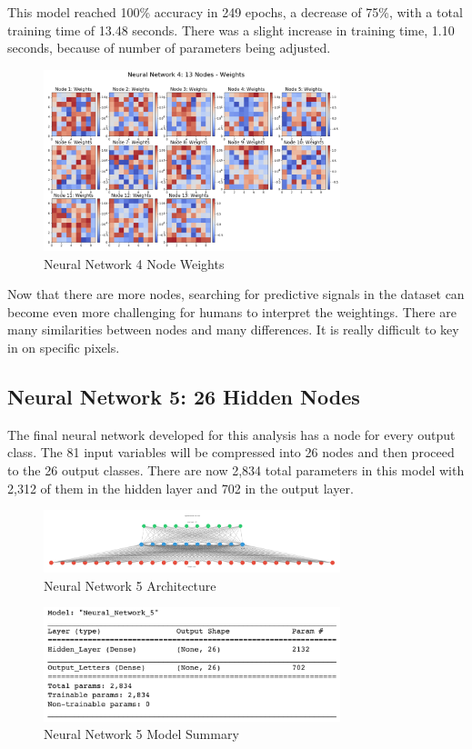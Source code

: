 \documentclass[5p,authoryear]{elsarticle}
\begin{document}
This model reached 100\% accuracy in 249 epochs, a decrease of 75\%, with a total training time of 13.48 seconds. 
There was a slight increase in training time, 1.10 seconds, because of number of parameters being adjusted.

\begin{figure}[!htb] \centering
	\includegraphics[width=3.4in]{figures/nn4_weights.png}
	\caption[]{Neural Network 4 Node Weights} 
	\label{test4d}
\end{figure}

Now that there are more nodes, searching for predictive signals in the dataset can become even more challenging for humans to interpret the weightings. 
There are many similarities between nodes and many differences. 
It is really difficult to key in on specific pixels.


\subsection{Neural Network 5: 26 Hidden Nodes}\label{one}

The final neural network developed for this analysis has a node for every output class. 
The 81 input variables will be compressed into 26 nodes and then proceed to the 26 output classes. 
There are now 2,834 total parameters in this model with 2,312 of them in the hidden layer and 702 in the output layer.

\begin{figure}[!htb] \centering
	\includegraphics[width=3.4in]{figures/nn5.pdf}
	\caption[]{Neural Network 5 Architecture} 
	\label{test5a} 
\end{figure}


\begin{figure}[!htb] \centering
	\includegraphics[width=3.4in]{figures/nn5 sum.png}
	\caption[]{Neural Network 5 Model Summary} 
	\label{test5b} 
\end{figure}
\end{document}

